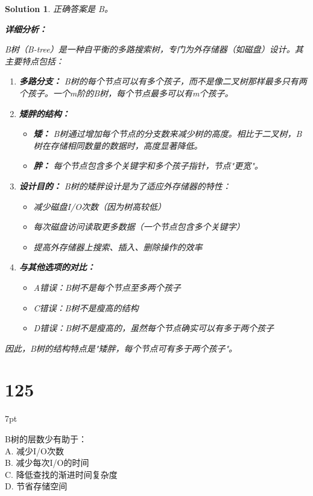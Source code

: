 \documentclass[UTF8]{report}
\newtheorem{solution}{Solution}
\theoremstyle{MyLineTheoremStyle} %
\theoremstyle{MyBlockTheoremStyle} %
\theoremstyle{MySubsubsectionStyle} %
\newenvironment{graybox}{%
        \def\FrameCommand{%
        \hspace{1pt}%
        {\color{gray}\small \vrule width 2pt}%
        {\color{graybox_color}\vrule width 4pt}%
        \colorbox{graybox_color}%
        }%
        \MakeFramed{\advance\hsize-\width\FrameRestore}%
        \noindent\hspace{-4.55pt}%
        \begin{adjustwidth}{}{7pt}%
        \vspace{2pt}\vspace{2pt}%
        }
        {%
        \vspace{2pt}\end{adjustwidth}\endMakeFramed%
        }
\begin{document}
\begin{solution}
正确答案是 B。

\textbf{详细分析：}

B树（B-tree）是一种自平衡的多路搜索树，专门为外存储器（如磁盘）设计。其主要特点包括：

\begin{enumerate}
    \item \textbf{多路分支：}
    B树的每个节点可以有多个孩子，而不是像二叉树那样最多只有两个孩子。一个m阶的B树，每个节点最多可以有m个孩子。

    \item \textbf{矮胖的结构：}
    \begin{itemize}
        \item \textbf{矮：} B树通过增加每个节点的分支数来减少树的高度。相比于二叉树，B树在存储相同数量的数据时，高度显著降低。
        \item \textbf{胖：} 每个节点包含多个关键字和多个孩子指针，节点"更宽"。
    \end{itemize}

    \item \textbf{设计目的：}
    B树的矮胖设计是为了适应外存储器的特性：
    \begin{itemize}
        \item 减少磁盘I/O次数（因为树高较低）
        \item 每次磁盘访问读取更多数据（一个节点包含多个关键字）
        \item 提高外存储器上搜索、插入、删除操作的效率
    \end{itemize}

    \item \textbf{与其他选项的对比：}
    \begin{itemize}
        \item A错误：B树不是每个节点至多两个孩子
        \item C错误：B树不是瘦高的结构
        \item D错误：B树不是瘦高的，虽然每个节点确实可以有多于两个孩子
    \end{itemize}
\end{enumerate}

因此，B树的结构特点是"矮胖，每个节点可有多于两个孩子"。
\end{solution}

\section*{125}
\begin{graybox}
B树的层数少有助于：\\
A. 减少I/O次数\\
B. 减少每次I/O的时间\\
C. 降低查找的渐进时间复杂度\\
D. 节省存储空间
\end{graybox}
\end{document}
